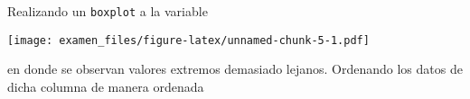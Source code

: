 \documentclass[
  10pt,
  spanish,
]{article}
\newenvironment{Shaded}{\begin{snugshade}}{\end{snugshade}}
\newcommand{\DataTypeTok}[1]{\textcolor[rgb]{0.13,0.29,0.53}{#1}}
\newcommand{\KeywordTok}[1]{\textcolor[rgb]{0.13,0.29,0.53}{\textbf{#1}}}
\newcommand{\NormalTok}[1]{#1}
\newcommand{\OperatorTok}[1]{\textcolor[rgb]{0.81,0.36,0.00}{\textbf{#1}}}
\newcommand{\StringTok}[1]{\textcolor[rgb]{0.31,0.60,0.02}{#1}}
\begin{document}
Realizando un \texttt{boxplot} a la variable

\begin{Shaded}
\end{Shaded}

\texttt{[image: examen\_files/figure-latex/unnamed-chunk-5-1.pdf]}

en donde se observan valores extremos demasiado lejanos. Ordenando los
datos de dicha columna de manera ordenada

\begin{Shaded}
\end{Shaded}
\end{document}
